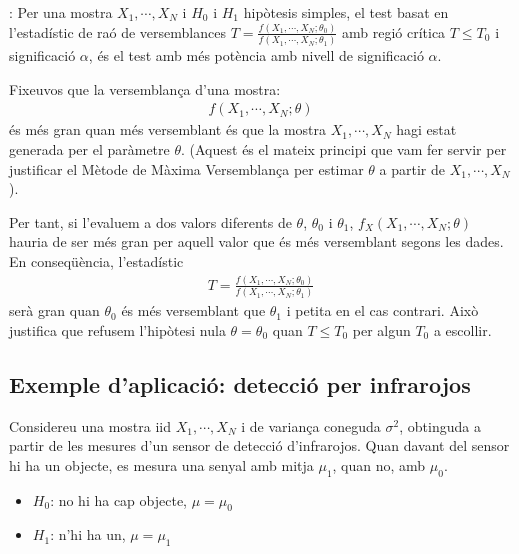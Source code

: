 \documentclass[letterpaper,10pt,english]{sphinxmanual}
\begin{document}
: Per una mostra \(X_1, \cdots, X_N\) i \(H_0\) i \(H_1\)
hipòtesis simples, el test basat en l’estadístic de raó de versemblances \(T = \frac{f(X_1, \cdots, X_N; \theta_0)}{f(X_1, \cdots, X_N; \theta_1)}\)
amb regió crítica \(T \leq T_0\) i significació \(\alpha\), és el test amb més potència amb nivell de significació \(\alpha\).

Fixeu\sphinxhyphen{}vos que la versemblança d’una mostra:
\begin{equation*}
\begin{split}f(X_1, \cdots, X_N; \theta)\end{split}
\end{equation*}
és més gran quan més versemblant és que la mostra \(X_1, \cdots, X_N\) hagi estat generada
per el paràmetre \(\theta\). (Aquest és el mateix principi que vam fer servir per justificar
el Mètode de Màxima Versemblança per estimar \(\theta\) a partir de \(X_1, \cdots, X_N\)).

Per tant, si l’evaluem a dos valors diferents de \(\theta\), \(\theta_0\) i \(\theta_1\),
\(f_X(X_1, \cdots, X_N; \theta)\) hauria de ser més gran per aquell valor
que és més versemblant segons les dades. En conseqüència, l’estadístic
\begin{equation*}
\begin{split}T = \frac{f(X_1, \cdots, X_N; \theta_0)}{f(X_1, \cdots, X_N; \theta_1)}\end{split}
\end{equation*}
serà gran quan \(\theta_0\) és més versemblant que \(\theta_1\) i petita
en el cas contrari. Això justifica que refusem l’hipòtesi nula
\(\theta=\theta_0\) quan \(T \leq T_0\) per algun \(T_0\) a escollir.


\subsection{Exemple d’aplicació: detecció per infra\sphinxhyphen{}rojos}
\label{\detokenize{0_Intro/0_4_Tests:exemple-d-aplicacio-deteccio-per-infra-rojos}}
Considereu una mostra iid \(X_1, \cdots, X_N\)  i de variança coneguda \(\sigma^2\),
obtinguda a partir de les mesures d’un sensor de detecció d’infra\sphinxhyphen{}rojos. Quan davant del sensor
hi ha un objecte, es mesura una senyal amb mitja \(\mu_1\), quan no, amb \(\mu_0\).
\begin{itemize}
\item {} 
\(H_0\): no hi ha cap objecte, \(\mu = \mu_0\)

\item {} 
\(H_1\): n’hi ha un, \(\mu = \mu_1\)

\end{itemize}
\end{document}
